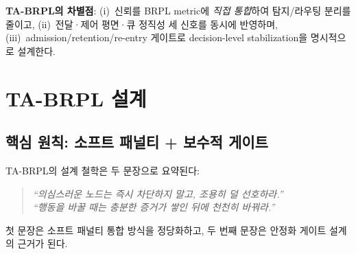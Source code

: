 \documentclass[12pt,a4paper]{article}
\begin{document}
\textbf{TA-BRPL의 차별점}: (i)~신뢰를 BRPL metric에 \emph{직접 통합}하여
탐지/라우팅 분리를 줄이고, (ii)~전달·제어 평면·큐 정직성 세 신호를
동시에 반영하며, (iii)~admission/retention/re-entry 게이트로
decision-level stabilization을 명시적으로 설계한다.


\section{TA-BRPL 설계}
\label{sec:design}

\subsection{핵심 원칙: 소프트 패널티 + 보수적 게이트}

TA-BRPL의 설계 철학은 두 문장으로 요약된다:
\begin{quote}
\textit{``의심스러운 노드는 즉시 차단하지 말고, 조용히 덜 선호하라.''}\\
\textit{``행동을 바꿀 때는 충분한 증거가 쌓인 뒤에 천천히 바꿔라.''}
\end{quote}
첫 문장은 소프트 패널티 통합 방식을 정당화하고,
두 번째 문장은 안정화 게이트 설계의 근거가 된다.
\end{document}
